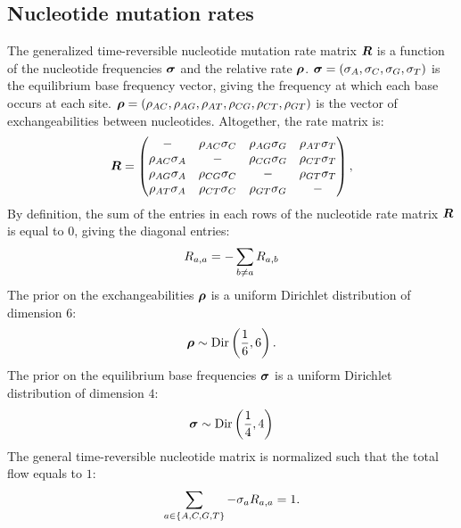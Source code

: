 \subsection{Nucleotide mutation rates}
The generalized time-reversible nucleotide mutation rate matrix $\bm{R}$ is a function of the nucleotide frequencies $\bm{\sigma}$ and the relative rate $\bm{\rho}$.
$\bm{\sigma} = (\sigma_A , \sigma_C , \sigma_G , \sigma_T)$ is the equilibrium base frequency vector, giving the frequency at which each base occurs at each site.
$\bm{\rho} = \left( \rho_{AC}, \rho_{AG}, \rho_{AT}, \rho_{CG}, \rho_{CT}, \rho_{GT}\right)$ is the vector of exchangeabilities between nucleotides.
Altogether, the rate matrix is:
\begin{equation}
\label{eq:gtr-mutrates}
\Mutmatrix = \begin{pmatrix}
- & {\exchan_{AC} \mutequi_C} & {\exchan_{AG}\mutequi_G} & {\exchan_{AT}\mutequi_T} \\ 
{\exchan_{AC}\mutequi_A} & - & {\exchan_{CG}\mutequi_G} & {\exchan_{CT}\mutequi_T} \\ 
{\exchan_{AG}\mutequi_A} & {\exchan_{CG}\mutequi_C} & - & {\exchan_{GT}\mutequi_T} \\ 
{\exchan_{AT}\mutequi_A} & {\exchan_{CT}\mutequi_C} & {\exchan_{GT}\mutequi_G} & - 
\end{pmatrix},
\end{equation}
By definition, the sum of the entries in each rows of the nucleotide rate matrix $\bm{R}$ is equal to $0$, giving the diagonal entries:
\begin{equation}
R_{a,a} = - \sum\limits_{ b \neq a} R_{a,b}
\end{equation}
The \gls{prior} on the exchangeabilities $\bm{\rho}$ is a uniform Dirichlet distribution of dimension $6$:
\begin{equation}
\label{eq:DistribExchan}
\Exchan \sim \mathrm{Dir}\left( \dfrac{1}{6} , 6\right).
\end{equation}
The \gls{prior} on the equilibrium base frequencies $\bm{\sigma}$ is a uniform Dirichlet distribution of dimension $4$:
\begin{equation}
\label{eq:DistribMutequi}
\Mutequi \sim \mathrm{Dir}\left( \dfrac{1}{4} , 4\right)
\end{equation}
The general time-reversible nucleotide matrix is normalized such that the total flow equals to $1$:
\begin{equation}
\sum\limits_{a \in \{A, C, G, T\}} - \sigma_a R_{a,a} = 1.
\end{equation}

